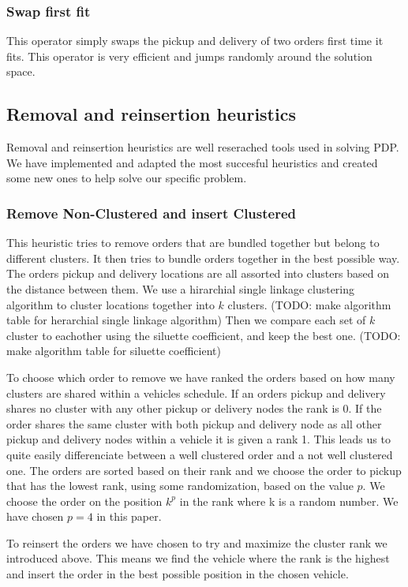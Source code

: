 \documentclass[../main.tex]{subfiles}
\begin{document}
\subsubsection{Swap first fit}
This operator simply swaps the pickup and delivery of two orders first time it fits. 
This operator is very efficient and jumps randomly around the solution space.

\subsection{Removal and reinsertion heuristics}
Removal and reinsertion heuristics are well reserached tools used in solving PDP. 
We have implemented and adapted the most succesful heuristics and created some new ones to help solve our specific problem. 
\subsubsection{Remove Non-Clustered and insert Clustered}
This heuristic tries to remove orders that are bundled together but belong to different clusters. It then tries to bundle orders together in the best possible way.
The orders pickup and delivery locations are all assorted into clusters based on the distance between them. 
We use a hirarchial single linkage clustering algorithm to cluster locations together into $k$ clusters. (TODO: make algorithm table for herarchial single linkage algorithm) 
Then we compare each set of $k$ cluster to eachother using the siluette coefficient, and keep the best one. (TODO: make algorithm table for siluette coefficient) \newlinw \par
To choose which order to remove we have ranked the orders based on how many clusters are shared within a vehicles schedule.
If an orders pickup and delivery shares no cluster with any other pickup or delivery nodes the rank is 0. 
If the order shares the same cluster with both pickup and delivery node as all other pickup and delivery nodes within a vehicle it is given a rank 1.  
This leads us to quite easily differenciate between a well clustered order and a not well clustered one.
The orders are sorted based on their rank and we choose the order to pickup that has the lowest rank, using some randomization, based on the value $p$. 
We choose the order on the position $k^p$ in the rank where k is a random number. 
We have chosen $p=4$ in this paper.  \newline \par
To reinsert the orders we have chosen to try and maximize the cluster rank we introduced above. This means we find the vehicle where the rank is the highest and insert the order in the best possible position in the chosen vehicle. 
\end{document}
